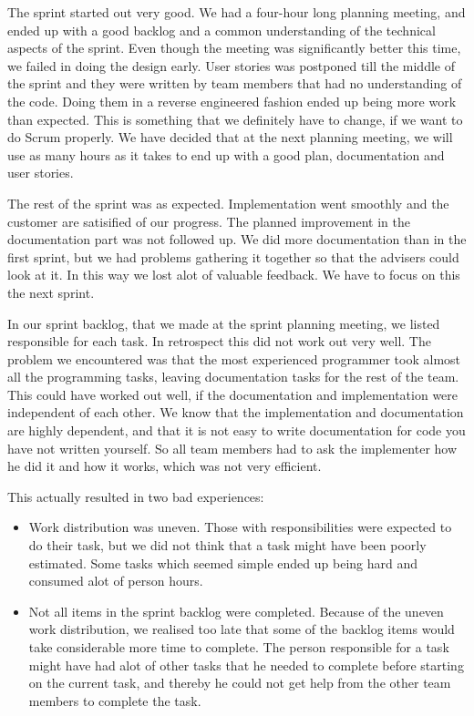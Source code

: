 The sprint started out very good. We had a four-hour long planning meeting, and ended up with a good backlog and a common understanding of the technical aspects of the sprint. Even though the meeting was significantly better this time, we failed in doing the design early. User stories was postponed till the middle of the sprint and they were written by team members that had no understanding of the code. Doing them in a reverse engineered fashion ended up being more work than expected. This is something that we definitely have to change, if we want to do Scrum properly. We have decided that at the next planning meeting, we will use as many hours as it takes to end up with a good plan, documentation and user stories.

The rest of the sprint was as expected. Implementation went smoothly and the customer are satisified of our progress. The planned improvement in the documentation part was not followed up. We did more documentation than in the first sprint, but we had problems gathering it together so that the advisers could look at it. In this way we lost alot of valuable feedback. We have to focus on this the next sprint.

In our sprint backlog, that we made at the sprint planning meeting, we listed responsible for each task. In retrospect this did not work out very well. The problem we encountered was that the most experienced programmer took almost all the programming tasks, leaving documentation tasks for the rest of the team. This could have worked out well, if the documentation and implementation were independent of each other. We know that the implementation and documentation are highly dependent, and that it is not easy to write documentation for code you have not written yourself. So all team members had to ask the implementer how he did it and how it works, which was not very efficient. 

This actually resulted in two bad experiences:
\begin{itemize}
\item Work distribution was uneven. Those with responsibilities were expected to do their task, but we did not think that a task might have been poorly estimated. Some tasks which seemed simple ended up being hard and consumed alot of person hours.
\item Not all items in the sprint backlog were completed. Because of the uneven work distribution, we realised too late that some of the backlog items would take considerable more time to complete. The person responsible for a task might have had alot of other tasks that he needed to complete before starting on the current task, and thereby he could not get help from the other team members to complete the task.
\end{itemize} 
 



